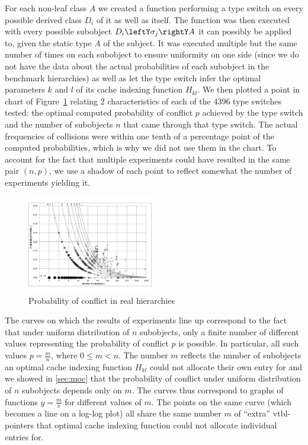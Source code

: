 For each non-leaf class $A$ we created a function performing a type switch on 
every possible derived class $D_i$ of it as well as itself. The function was 
then executed with every possible subobject $D_i\leftY\sigma_j\rightY A$ it can  
possibly be applied to, given the static type $A$ of the subject. It was 
executed multiple but the same number of times on each subobject to ensure 
uniformity on one side (since we do not have the data about the actual 
probabilities of each subobject in the benchmark hierarchies) as well as let the 
type switch infer the optimal parameters $k$ and $l$ of its cache indexing 
function $H_{kl}$. We then plotted a point in chart of Figure~\ref{fig:prob} 
relating 2 characteristics of each of the 4396 type switches tested: the optimal 
computed probability of conflict $p$ achieved by the type switch and the number 
of subobjects $n$ that came through that type switch. The actual frequencies of 
collisions were within one tenth of a percentage point of the computed 
probabilities, which is why we did not use them in the chart. To account for the 
fact that multiple experiments could have resulted in the same pair $(n,p)$, we 
use a shadow of each point to reflect somewhat the number of experiments 
yielding it.

\begin{figure}[htbp]
  \centering
    \includegraphics[width=0.49\textwidth]{ClassHierarchies.pdf}
  \caption{Probability of conflict in real hierarchies}
  \label{fig:prob}
\end{figure}

The curves on which the results of experiments line up correspond to the fact 
that under uniform distribution of $n$ subobjects, only a finite number of 
different values representing the probability of conflict $p$ is possible. In 
particular, all such values $p=\frac{m}{n}$, where $0 \le m < n$. The number $m$ 
reflects the number of subobjects an optimal cache indexing function $H_{kl}$ 
could not allocate their own entry for and we showed in \textsection\ref{sec:moc} 
that the probability of conflict under uniform distribution of $n$ subobjects 
depends only on $m$. The curves thus correspond to graphs of functions 
$y=\frac{m}{x}$ for different values of $m$. The points on the same curve (which 
becomes a line on a log-log plot) all share the same number $m$ of ``extra'' 
vtbl-pointers that optimal cache indexing function could not allocate individual 
entries for.

